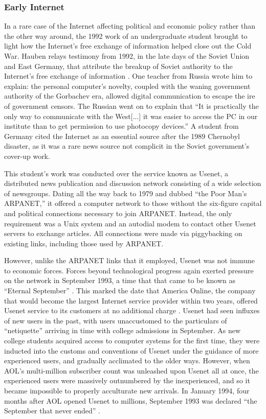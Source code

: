 \documentclass[journal]{IEEEtran}
\begin{document}
\subsubsection{Early Internet}
In a rare case of the Internet affecting political and economic policy rather than the other way around, the 1992 work of an undergraduate student brought to light how the Internet's free exchange of information helped close out the Cold War. Hauben relays testimony from 1992, in the late days of the Soviet Union and East Germany, that attribute the breakup of Soviet authority to the Internet's free exchange of information \cite{haubenusenet98}. One teacher from Russia wrote him to explain: the personal computer's novelty, coupled with the waning government authority of the Gorbachev era, allowed digital communication to escape the ire of government censors. The Russian went on to explain that \enquote{It is practically the only way to communicate with the West[...] it was easier to access the PC in our institute than to get permission to use photocopy devices.} A student from Germany cited the Internet as an essential source after the 1989 Chernobyl disaster, as it was a rare news source not complicit in the Soviet government's cover-up work.

This student's work was conducted over the service known as Usenet, a distributed news publication and discussion network consisting of a wide selection of newsgroups. Dating all the way back to 1979 and dubbed \enquote{the Poor Man's ARPANET,} it offered a computer network to those without the six-figure capital and political connections necessary to join ARPANET. Instead, the only requirement was a Unix system and an autodial modem to contact other Usenet servers to exchange articles. All connections were made via piggybacking on existing links, including those used by ARPANET.

However, unlike the ARPANET links that it employed, Usenet was not immune to economic forces. Forces beyond technological progress again exerted pressure on the network in September 1993, a time that that came to be known as \enquote{Eternal September} \cite{eternalseptember}. This marked the date that America Online, the company that would become the largest Internet service provider within two years, offered Usenet service to its customers at no additional charge \cite{aolsize}. Usenet had seen influxes of new users in the past, with users unaccustomed to the particulars of \enquote{netiquette} arriving in time with college admissions in September. As new college students acquired access to computer systems for the first time, they were inducted into the customs and conventions of Usenet under the guidance of more experienced users, and gradually acclimated to the older ways. However, when AOL's multi-million subscriber count was unleashed upon Usenet all at once, the experienced users were massively outnumbered by the inexperienced, and so it became impossible to properly acculturate new arrivals. In January 1994, four months after AOL opened Usenet to millions, September 1993 was declared \enquote{the September that never ended} \cite{eternalseptember94}.
\end{document}
